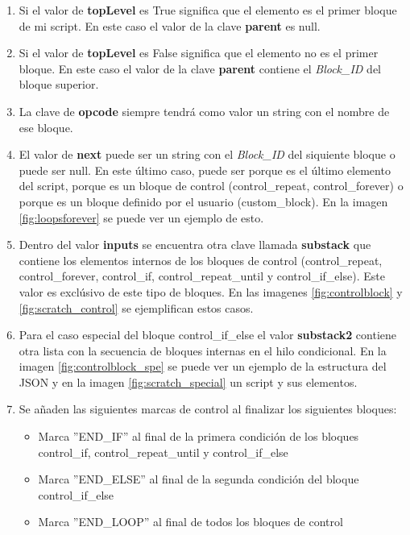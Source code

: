 \documentclass[a4paper, 12pt]{book}
\begin{document}
\begin{enumerate}
\item Si el valor de \textbf{topLevel} es True significa que el elemento es el primer bloque de mi script. En este caso el valor de la clave \textbf{parent} es null. 
\item Si el valor de \textbf{topLevel} es False significa que el elemento no es el primer bloque. En este caso el valor de la clave \textbf{parent} contiene el \textit{Block\_ID} del bloque superior.
\item La clave de \textbf{opcode} siempre tendrá como valor un string con el nombre de ese bloque.
\item El valor de \textbf{next} puede ser un string con el \textit{Block\_ID} del siquiente bloque o puede ser null. En este último caso, puede ser porque es el último elemento del script, porque es un bloque de control (control\_repeat, control\_forever) o porque es un bloque definido por el usuario (custom\_block). En la imagen \ref{fig:loopsforever} se puede ver un ejemplo de esto.
\item Dentro del valor \textbf{inputs} se encuentra otra clave llamada \textbf{substack} que contiene los elementos internos de los bloques de control (control\_repeat, control\_forever, control\_if, control\_repeat\_until y control\_if\_else). Este valor es exclúsivo de este tipo de bloques. En las imagenes \ref{fig:controlblock} y \ref{fig:scratch_control} se ejemplifican estos casos.
\item Para el caso especial del bloque control\_if\_else el valor \textbf{substack2} contiene otra lista con la secuencia de bloques internas en el hilo condicional. En la imagen \ref{fig:controlblock_spe} se puede ver un ejemplo de la estructura del JSON y en la imagen \ref{fig:scratch_special} un script y sus elementos.
\item Se añaden las siguientes marcas de control al finalizar los siguientes bloques:
\begin{itemize}
\item Marca ''END\_IF'' al final de la primera condición de los bloques control\_if, control\_repeat\_until y control\_if\_else
\item Marca ''END\_ELSE'' al final de la segunda condición del bloque control\_if\_else
\item Marca ''END\_LOOP'' al final de todos los bloques de control
\end{itemize}
\end{enumerate}
\end{document}
